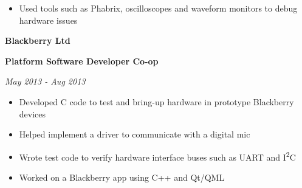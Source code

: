 \documentclass{article}
\newenvironment{name}{\fontfamily{phv}\selectfont\bfseries\normalsize}{\par}
\newenvironment{colorheading}{\fontfamily{phv}\selectfont\bfseries\normalsize\color{darkcyan}}{\par}
\newenvironment{metadata}{\fontfamily{phv}\selectfont\itshape\small\color{darkgray}}{\par}
\newenvironment{itemizedbody}{\fontfamily{phv}\selectfont\small\begin{itemize}}{\end{itemize}\par}
\newenvironment{experience}[2]%
{%
  \begin{minipage}{0.6\linewidth}\begin{flushleft}#1\end{flushleft}\end{minipage}%
  \hfill%
  \begin{minipage}{0.3\linewidth}\begin{flushright}#2\end{flushright}\end{minipage}%
}%
{}
\newcommand{\lineitem}{\item[{$\to$}]}
\begin{document}
\begin{minipage}[t]{0.6\linewidth}
\begin{itemizedbody}
      \lineitem Used tools such as Phabrix, oscilloscopes and waveform monitors to debug hardware issues
    \end{itemizedbody}
    \smallskip
    \begin{experience}
    {
      \begin{name}Blackberry Ltd\end{name}
      \begin{colorheading}Platform Software Developer Co-op\end{colorheading}
    }
    {
      \begin{metadata}May 2013 - Aug 2013\end{metadata}
    }
    \end{experience}
    \begin{itemizedbody}
      \lineitem Developed C code to test and bring-up hardware in prototype Blackberry devices
      \lineitem Helped implement a driver to communicate with a digital mic
      \lineitem Wrote test code to verify hardware interface buses such as UART and I\textsuperscript{2}C
      \lineitem Worked on a Blackberry app using C++ and Qt/QML
    \end{itemizedbody}

\end{minipage}
\end{document}
